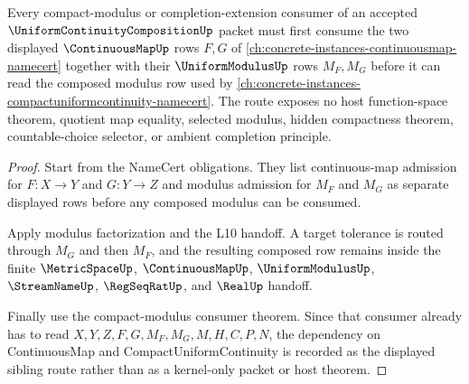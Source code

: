 \begin{theorem}
\label{thm:uniform-continuity-composition-continuousmap-route}
Every compact-modulus or completion-extension consumer of an accepted $\UniformContinuityCompositionUp$ packet must first consume the two displayed $\ContinuousMapUp$ rows $F,G$ of \autoref{ch:concrete-instances-continuousmap-namecert} together with their $\UniformModulusUp$ rows $M_F,M_G$ before it can read the composed modulus row used by \autoref{ch:concrete-instances-compactuniformcontinuity-namecert}. The route exposes no host function-space theorem, quotient map equality, selected modulus, hidden compactness theorem, countable-choice selector, or ambient completion principle.
\end{theorem}
\begin{proof}
Start from the NameCert obligations. They list continuous-map admission for $F:X\to Y$ and $G:Y\to Z$ and modulus admission for $M_F$ and $M_G$ as separate displayed rows before any composed modulus can be consumed.

Apply modulus factorization and the L10 handoff. A target tolerance is routed through $M_G$ and then $M_F$, and the resulting composed row remains inside the finite $\MetricSpaceUp$, $\ContinuousMapUp$, $\UniformModulusUp$, $\StreamNameUp$, $\RegSeqRatUp$, and $\RealUp$ handoff.

Finally use the compact-modulus consumer theorem. Since that consumer already has to read $X,Y,Z,F,G,M_F,M_G,M,H,C,P,N$, the dependency on ContinuousMap and CompactUniformContinuity is recorded as the displayed sibling route rather than as a kernel-only packet or host theorem.
\end{proof}


